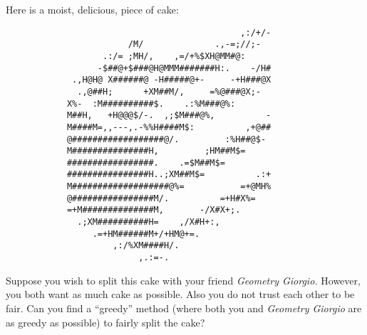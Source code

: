 \documentclass[noauthor,nooutcomes,hints,handout,12pt]{ximera}
\begin{document}
\begin{question}



  Here is a moist, delicious, piece of cake:
            
\begin{verbatim}
                                              ,:/+/-
                        /M/              .,-=;//;-
                   .:/= ;MH/,    ,=/+%$XH@MM#@:
                  -$##@+$###@H@MMM#######H:.    -/H#
             .,H@H@ X######@ -H#####@+-     -+H###@X
              .,@##H;      +XM##M/,     =%@###@X;-
            X%-  :M##########$.    .:%M###@%:
            M##H,   +H@@@$/-.  ,;$M###@%,          -
            M####M=,,---,.-%%H####M$:          ,+@##
            @##################@/.         :%H##@$-
            M###############H,         ;HM##M$=
            #################.    .=$M##M$=
            ################H..;XM##M$=          .:+
            M###################@%=           =+@MH%
            @################M/.          =+H#X%=
            =+M##############M,       -/X#X+;.
              .;XM##########H=    ,/X#H+:,
                 .=+HM######M+/+HM@+=.
                     ,:/%XM####H/.
                          ,.:=-.                    
\end{verbatim}

Suppose you wish to split this cake with your friend \textit{Geometry
  Giorgio.} However, you both want as much cake as possible. Also you
do not trust each other to be fair. Can you find a ``greedy'' method (where both you and \textit{Geometry Giorgio} are as greedy as possible) to fairly split
the cake?
\end{question}


\mynewpage
\end{document}
